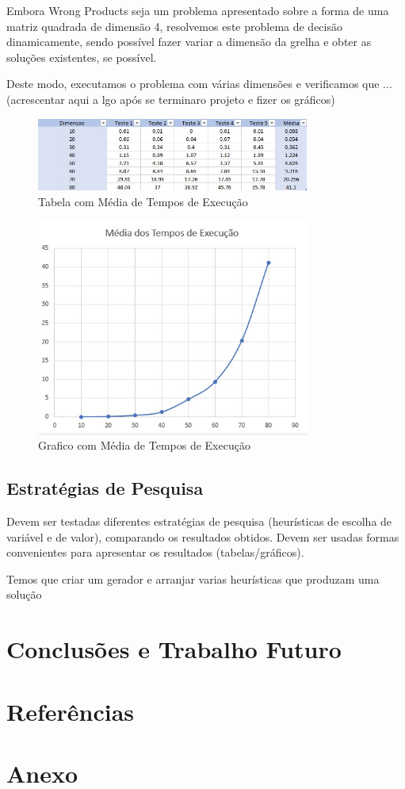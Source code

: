 \documentclass[11pt]{article}
\begin{document}
Embora Wrong Products seja um problema apresentado sobre a forma de uma matriz quadrada de 
dimensão 4, resolvemos este problema de decisão dinamicamente, sendo possível fazer variar a 
dimensão da grelha e obter as soluções existentes, se possível.

Deste modo, executamos o problema com várias dimensões e verificamos que ...(acrescentar aqui a
lgo após se terminaro projeto e fizer os gráficos)

\begin{figure}[h!]
	\begin{center}
		\includegraphics[width=0.8\textwidth]{tabela-normal.jpg}
		\caption{Tabela com Média de Tempos de Execução}
	\end{center}
\end{figure}

\begin{figure}[h!]
	\begin{center}
		\includegraphics[width=0.8\textwidth]{grafico-normal.jpg}
		\caption{Grafico com Média de Tempos de Execução}
	\end{center}
\end{figure}

\subsection{Estratégias de Pesquisa} Devem ser testadas diferentes estratégias de pesquisa
(heurísticas de escolha de variável e de valor), comparando os resultados obtidos.
Devem ser usadas formas convenientes para apresentar os resultados (tabelas/gráficos).

Temos que criar um gerador e arranjar varias heurísticas que produzam uma solução

\section{Conclusões e Trabalho Futuro} 


\section{Referências} 



\section{Anexo} 
\end{document}
